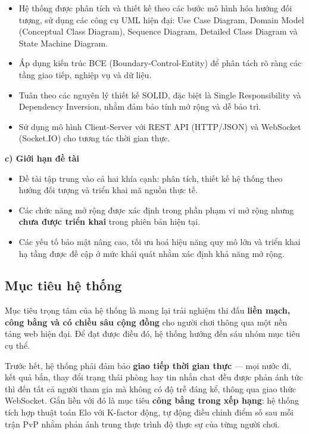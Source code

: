 \documentclass[13pt, a4paper]{extreport}
\begin{document}
\begin{itemize}
  \item Hệ thống được phân tích và thiết kế theo các bước mô hình hóa hướng đối tượng, sử dụng
    các công cụ UML hiện đại: Use Case Diagram, Domain Model (Conceptual Class Diagram), Sequence
    Diagram, Detailed Class Diagram và State Machine Diagram.
  \item Áp dụng kiến trúc BCE (Boundary-Control-Entity) để phân tách rõ ràng các tầng giao tiếp,
    nghiệp vụ và dữ liệu.
  \item Tuân theo các nguyên lý thiết kế SOLID, đặc biệt là Single Responsibility và Dependency
    Inversion, nhằm đảm bảo tính mở rộng và dễ bảo trì.
  \item Sử dụng mô hình Client-Server với REST API (HTTP/JSON) và WebSocket (Socket.IO) cho tương
    tác thời gian thực.
\end{itemize}

\textbf{c) Giới hạn đề tài}

\begin{itemize}
  \item Đề tài tập trung vào cả hai khía cạnh: phân tích, thiết kế hệ thống theo hướng đối tượng
    và triển khai mã nguồn thực tế.
  \item Các chức năng mở rộng được xác định trong phần phạm vi mở rộng nhưng \textbf{chưa được
    triển khai} trong phiên bản hiện tại.
  \item Các yếu tố bảo mật nâng cao, tối ưu hoá hiệu năng quy mô lớn và triển khai hạ tầng được
    đề cập ở mức khái quát nhằm xác định khả năng mở rộng.
\end{itemize}

\subsection{Mục tiêu hệ thống}

Mục tiêu trọng tâm của hệ thống là mang lại trải nghiệm thi đấu \textbf{liền mạch, công bằng và
có chiều sâu cộng đồng} cho người chơi thông qua một nền tảng web hiện đại. Để đạt được điều đó,
hệ thống hướng đến sáu nhóm mục tiêu cụ thể.

Trước hết, hệ thống phải đảm bảo \textbf{giao tiếp thời gian thực} — mọi nước đi, kết quả bắn,
thay đổi trạng thái phòng hay tin nhắn chat đều được phản ánh tức thì đến tất cả người tham gia
mà không có độ trễ đáng kể, thông qua giao thức WebSocket. Gắn liền với đó là mục tiêu \textbf{công
bằng trong xếp hạng}: hệ thống tích hợp thuật toán Elo với K-factor động, tự động điều chỉnh điểm
số sau mỗi trận PvP nhằm phản ánh trung thực trình độ thực sự của từng người chơi.
\end{document}
